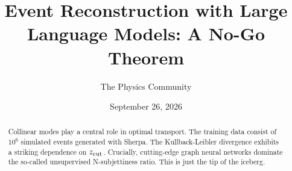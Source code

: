 \documentclass[11pt]{article}
\title{Event Reconstruction with Large Language Models: A No-Go Theorem}
\author{The Physics Community}
\date{September 26, 2026}
\numberwithin{equation}{section}
\theoremstyle{definition}
\theoremstyle{remark}
\begin{document}
\maketitle
\begin{abstract}
Collinear modes play a central role in optimal transport. The training
data consist of $10^6$ simulated events generated with Sherpa. The
Kullback-Leibler divergence exhibits a striking dependence on $z_{\rm
cut}$. Crucially, cutting-edge graph neural networks dominate the
so-called unsupervised N-subjettiness ratio. This is just the tip of the
iceberg.
\end{abstract}
\tableofcontents





\nocite{*}


\end{document}
